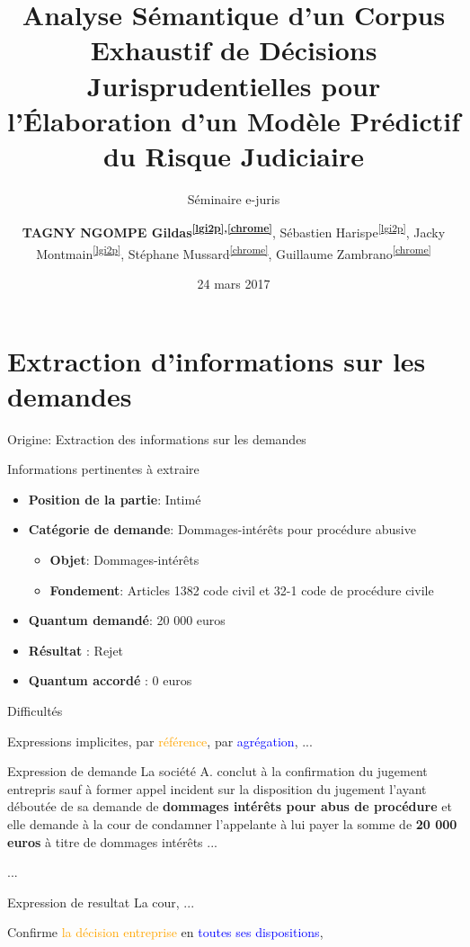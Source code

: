 \documentclass[newPxFont,pagenumber]{beamer}
\title{\normalsize Analyse Sémantique d'un Corpus Exhaustif de Décisions Jurisprudentielles pour l'Élaboration d'un Modèle Prédictif du Risque Judiciaire}
\subtitle{\small Séminaire e-juris
}
\date{\scriptsize 24 mars 2017}
\author{\textbf{TAGNY NGOMPE Gildas\textsuperscript{\ref{lgi2p},\ref{chrome}}}, Sébastien Harispe\textsuperscript{\ref{lgi2p}}, Jacky Montmain\textsuperscript{\ref{lgi2p}}, Stéphane Mussard\textsuperscript{\ref{chrome}}, Guillaume Zambrano\textsuperscript{\ref{chrome}}}
\institute{%
\begin{enumerate}
\item LGI2P (École des mines d'Alès) \label{lgi2p}
\item CHROME EA 7352 (Université de Nîmes) \label{chrome}
\end{enumerate}
}
\begin{document}
\nocite{}

%
%
\section{Extraction d'informations sur les demandes}

\begin{frame}{Origine: Extraction des informations sur les demandes}
\begin{block}{Informations pertinentes à extraire}
\begin{itemize}
\item \textbf{Position de la partie}: Intimé
\item \textbf{Catégorie de demande}: Dommages-intérêts pour procédure abusive
\begin{itemize}
\item \textbf{Objet}: Dommages-intérêts
\item \textbf{Fondement}: Articles 1382 code civil et 32-1 code de procédure civile
\end{itemize}
\item \textbf{Quantum demandé}: 20 000 euros
\item \textbf{Résultat} : Rejet
\item \textbf{Quantum accordé} : 0 euros
\end{itemize}
\end{block}
\end{frame}
\begin{frame}{Difficultés}

Expressions implicites, par  \textcolor{orange}{référence}, par \textcolor{blue}{agrégation}, ...

\begin{exampleblock}{Expression de demande}
La société A. conclut à la confirmation du jugement entrepris sauf à
former appel incident sur la disposition du jugement l'ayant déboutée de sa
demande de \textbf{dommages intérêts pour abus de procédure} et elle demande à la cour de
condamner l'appelante à lui payer la somme de \textbf{20 000 euros} à titre de dommages
intérêts ...


...
\end{exampleblock}

\begin{exampleblock}{Expression de resultat}
La cour, ... 

Confirme \textcolor{orange}{la décision entreprise} en \textcolor{blue}{toutes ses dispositions},
\end{exampleblock}
\end{frame}
\end{document}
